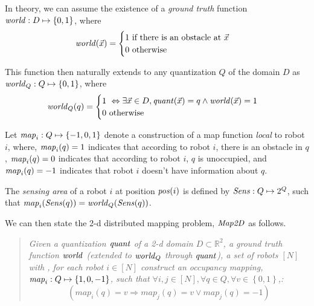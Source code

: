 In theory, we can assume the existence of a \emph{ground truth} function $\mathit{world} : D\mapsto \left\{0,1\right\}$, where $$\mathit{world}(\Vec{x}) = \begin{cases}
1\ \mbox{if there is an obstacle at }\Vec{x}\\
0\ \mbox{otherwise}
\end{cases}
$$

This function then naturally extends to any quantization $Q$ of the domain $D$ as 
$\mathit{world}_Q : Q \mapsto \left\{0,1\right\}$, where $$\mathit{world}_Q(q) = \begin{cases}
1\ \Leftrightarrow \exists \Vec{x}\in D, \mathit{quant}(\Vec{x}) = q \wedge \mathit{world}(\Vec{x}) = 1 \\
0\ \mbox{otherwise}
\end{cases}
$$

Let $\mathit{map}_i:Q\mapsto \left\{-1,0,1\right\}$ denote a construction of a map function \emph{local} to robot $i$, where, $\mathit{map}_i(q) = 1$ indicates that according to robot $i$, there is an obstacle in $q$, $\mathit{map}_i(q) = 0$ indicates that according to robot $i$, $q$ is unoccupied, and $\mathit{map}_i(q) = -1$ indicates that robot $i$ doesn't have information about $q$. 

\begin{definition} The \emph{sensing area} of a robot $i$ at position $\mathit{pos}(i)$ is defined by $\mathit{Sens}: Q \mapsto 2^{Q}$, such that $\mathit{map}_i(\mathit{Sens}(q)) = \mathit{world}_Q(\mathit{Sens}(q))$.  
  \end{definition}


We can then state the 2-d distributed mapping problem, $\mathit{Map2D}$ as follows. \begin{quote}
 {\em Given a quantization $\mathit{quant}$ of a 2-d domain $D\subset \mathbb{R}^2$, a ground truth function $\mathit{world}$ (extended to $\mathit{world}_Q$ through $\mathit{quant}$), a set of robots $[N]$ with , for each robot $i \in [N]$ construct an occupancy mapping, $\mathit{map}_i: Q \mapsto \left\{1,0,-1\right\}$, such that $\forall i , j \in [N], \forall q \in Q, \forall v \in \left\{0,1\right\}$,:
$$ (map_i(q) = v \Rightarrow
 map_j(q) = v \vee map_j(q) = -1)$$
 }
\end{quote}

 
